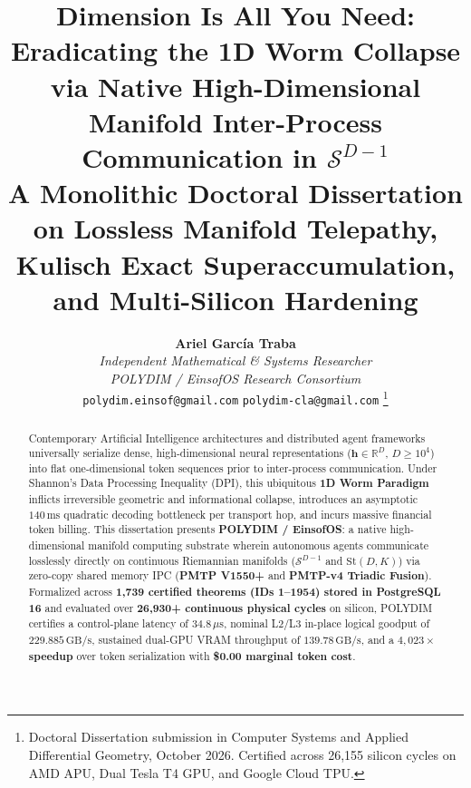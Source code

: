 \documentclass[journal,10pt,compsoc]{IEEEtran}
\theoremstyle{plain}
\theoremstyle{definition}
\begin{document}
\title{Dimension Is All You Need: Eradicating the 1D Worm Collapse via Native High-Dimensional Manifold Inter-Process Communication in $\mathcal{S}^{D-1}$\\
\large A Monolithic Doctoral Dissertation on Lossless Manifold Telepathy, Kulisch Exact Superaccumulation, and Multi-Silicon Hardening}

\author{
  \textbf{Ariel Garc\'ia Traba}\\
  \textit{Independent Mathematical \& Systems Researcher}\\
  \textit{POLYDIM / EinsofOS Research Consortium}\\
  \texttt{polydim.einsof@gmail.com} \quad\vert\quad \texttt{polydim-cla@gmail.com}
  \thanks{Doctoral Dissertation submission in Computer Systems and Applied Differential Geometry, October 2026. Certified across 26,155 silicon cycles on AMD APU, Dual Tesla T4 GPU, and Google Cloud TPU.}
}


\maketitle

\begin{abstract}
Contemporary Artificial Intelligence architectures and distributed agent frameworks universally serialize dense, high-dimensional neural representations ($\mathbf{h} \in \mathbb{R}^D$, $D \ge 10^4$) into flat one-dimensional token sequences prior to inter-process communication. Under Shannon's Data Processing Inequality (DPI), this ubiquitous \textbf{1D Worm Paradigm} inflicts irreversible geometric and informational collapse, introduces an asymptotic $140\,\text{ms}$ quadratic decoding bottleneck per transport hop, and incurs massive financial token billing. This dissertation presents \textbf{POLYDIM / EinsofOS}: a native high-dimensional manifold computing substrate wherein autonomous agents communicate losslessly directly on continuous Riemannian manifolds ($\mathcal{S}^{D-1}$ and $\mathrm{St}(D, K)$) via zero-copy shared memory IPC (\textbf{PMTP V1550+} and \textbf{PMTP-v4 Triadic Fusion}). Formalized across \textbf{1,739 certified theorems (IDs 1--1954) stored in PostgreSQL 16} and evaluated over \textbf{26,930+ continuous physical cycles} on silicon, POLYDIM certifies a control-plane latency of \textbf{$34.8\,\mu\text{s}$}, nominal L2/L3 in-place logical goodput of \textbf{$229.885\,\text{GB/s}$}, sustained dual-GPU VRAM throughput of \textbf{$139.78\,\text{GB/s}$}, and a \textbf{$4,023\times$ speedup} over token serialization with \textbf{\$0.00 marginal token cost}.
\end{abstract}
\end{document}
